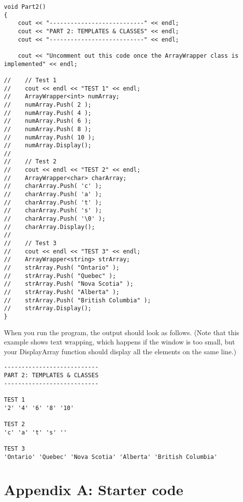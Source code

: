 \documentclass[a4paper,12pt,oneside]{book}
\begin{document}
\begin{lstlisting}[style=code]
void Part2()
{
    cout << "---------------------------" << endl;
    cout << "PART 2: TEMPLATES & CLASSES" << endl;
    cout << "---------------------------" << endl;

    cout << "Uncomment out this code once the ArrayWrapper class is implemented" << endl;

//    // Test 1
//    cout << endl << "TEST 1" << endl;
//    ArrayWrapper<int> numArray;
//    numArray.Push( 2 );
//    numArray.Push( 4 );
//    numArray.Push( 6 );
//    numArray.Push( 8 );
//    numArray.Push( 10 );
//    numArray.Display();
//
//    // Test 2
//    cout << endl << "TEST 2" << endl;
//    ArrayWrapper<char> charArray;
//    charArray.Push( 'c' );
//    charArray.Push( 'a' );
//    charArray.Push( 't' );
//    charArray.Push( 's' );
//    charArray.Push( '\0' );
//    charArray.Display();
//
//    // Test 3
//    cout << endl << "TEST 3" << endl;
//    ArrayWrapper<string> strArray;
//    strArray.Push( "Ontario" );
//    strArray.Push( "Quebec" );
//    strArray.Push( "Nova Scotia" );
//    strArray.Push( "Alberta" );
//    strArray.Push( "British Columbia" );
//    strArray.Display();
}
\end{lstlisting}

    \newpage

    When you run the program, the output should look as follows.
    (Note that this example shows text wrapping, which happens if the
    window is too small, but your DisplayArray function should display
    all the elements on the same line.)

\begin{lstlisting}[style=output]
---------------------------
PART 2: TEMPLATES & CLASSES
---------------------------

TEST 1
'2' '4' '6' '8' '10' 

TEST 2
'c' 'a' 't' 's' '' 

TEST 3
'Ontario' 'Quebec' 'Nova Scotia' 'Alberta' 'British Columbia' 
\end{lstlisting}













    \newpage
    \section{Appendix A: Starter code}
\end{document}
